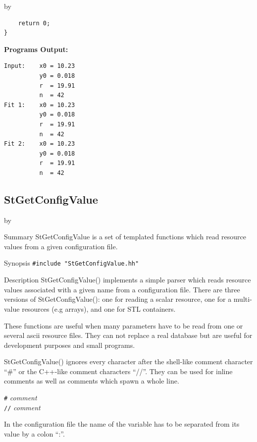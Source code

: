 \documentclass[twoside]{article}
\newcommand{\comp}[1]{\texttt{#1}}%
\newcommand{\args}[1]{\textit{#1}}%
\newcommand{\entrylabel}[1]{\mbox{\textbf{{#1}}}\hfil}%
\newenvironment{entry}
{\begin{list}{}%
    {\renewcommand{\makelabel}{\entrylabel}%
     \setlength{\labelwidth}{90pt}%
     \setlength{\leftmargin}{\labelwidth}
     \advance\leftmargin by \labelsep%
      }%
    }%
  {\end{list}}
\newcommand{\Entrylabel}[1]%
{\raisebox{0pt}[1ex][0pt]{\makebox[\labelwidth][l]%
    {\parbox[t]{\labelwidth}{\hspace{0pt}\textbf{{#1}}}}}}
\newenvironment{Entry}%
{\renewcommand{\entrylabel}{\Entrylabel}\begin{entry}}%
  {\end{entry}}
\begin{document}
\begin{description}
\begin{Entry}
{\begin{verbatim}
    return 0;
}
\end{verbatim}
}%
{\bf Programs Output:}
{\footnotesize
\begin{verbatim}
Input:    x0 = 10.23
          y0 = 0.018
          r  = 19.91
          n  = 42
Fit 1:    x0 = 10.23
          y0 = 0.018
          r  = 19.91
          n  = 42
Fit 2:    x0 = 10.23
          y0 = 0.018
          r  = 19.91
          n  = 42
\end{verbatim}
} %
\end{Entry}

\clearpage

%
%
\subsection{StGetConfigValue }
\begin{Entry}
\item[Summary]
    StGetConfigValue is a set of templated functions which read
    resource values from a given configuration file.
    
\item[Synopsis]
    \verb+#include "StGetConfigValue.hh"+
    
  
\item[Description]
    StGetConfigValue() implements a simple parser which reads resource values associated
    with a given name from a configuration file.
    There are three versions of StGetConfigValue(): one for
    reading a scalar resource, one for a multi-value
    resources (e.g arrays), and one for STL containers. 

    These functions are useful when many parameters have to be read from
    one or several ascii resource files. They can not replace a real database but
    are useful for development purposes and small programs.

    StGetConfigValue() ignores every character after the shell-like comment character ``\#''
    or the C++-like comment characters ``//''. They can be used for inline comments
    as well as comments which spawn a whole line.
    
    \comp{\#} \args{comment}\\
    \comp{//} \args{comment}

    In the configuration file the name of the variable has to be separated from its value
    by a colon ``:''.
    

\end{Entry}
\end{description}
\end{document}
